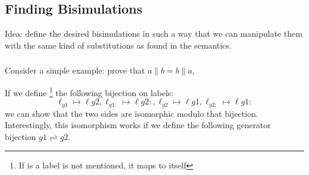 \subsection{Finding Bisimulations}


Idea: define the desired bisimulations in such a way that
we can manipulate them with the same kind of substitutions
as found in the semantics.

\subsubsection{}

Consider a simple example: prove that $a \parallel b = b \parallel a$,


If we define%
\footnote{If is a label is not mentioned, it maps to itself}
the following bijection on labels:
\[
  \ell_{g1} \mapsto \ell{g2}
, \ell_{g1:} \mapsto \ell{g2:}
, \ell_{g2} \mapsto \ell{g1}
, \ell_{g2:} \mapsto \ell{g1:}
\]
we can show that the two sides are isomorphic modulo that bijection.
Interestingly, this isomorphism works if we define the following
generator bijection $g1 \rightleftharpoons g2$.

